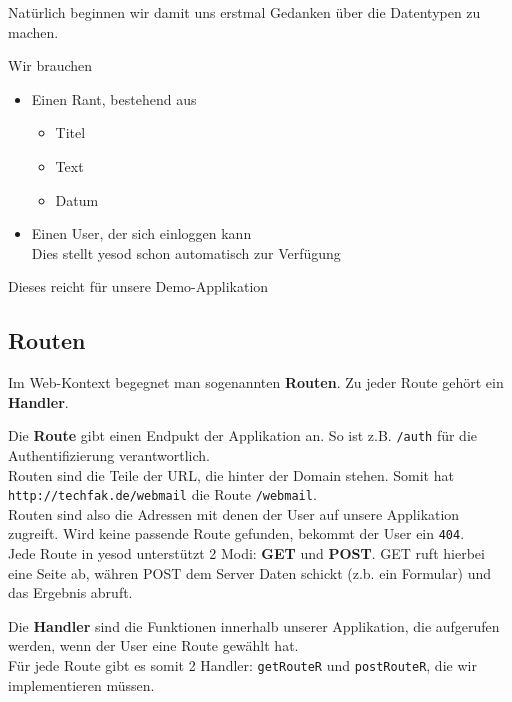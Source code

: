 \documentclass{beamer}
\begin{document}
\begin{frame}[fragile]
Natürlich beginnen wir damit uns erstmal Gedanken über die Datentypen zu machen.\\\par
\pause
Wir brauchen
\pause
\begin{itemize}
 \item Einen Rant, bestehend aus
       \begin{itemize}
        \item Titel
        \item Text
        \item Datum
       \end{itemize}
 \pause
 \item Einen User, der sich einloggen kann\\\pause
       Dies stellt yesod schon automatisch zur Verfügung
\end{itemize}
\pause
Dieses reicht für unsere Demo-Applikation
\end{frame}

\subsection{Routen}
\begin{frame}[fragile]
Im Web-Kontext begegnet man sogenannten \textbf{Routen}. Zu jeder Route gehört ein \textbf{Handler}.\\\pause \par
Die \textbf{Route} gibt einen Endpukt der Applikation an. So ist z.B. \texttt{/auth} für die Authentifizierung verantwortlich.\\\pause
Routen sind die Teile der URL, die hinter der Domain stehen. Somit hat \texttt{http://techfak.de/webmail} die Route \texttt{/webmail}.\\\pause
Routen sind also die Adressen mit denen der User auf unsere Applikation zugreift. Wird keine passende Route gefunden, bekommt der User ein \texttt{404}.\\\pause
Jede Route in yesod unterstützt 2 Modi: \textbf{GET} und \textbf{POST}. GET ruft hierbei eine Seite ab, währen POST dem Server Daten schickt (z.b. ein Formular) und das Ergebnis abruft.\\\pause\par
Die \textbf{Handler} sind die Funktionen innerhalb unserer Applikation, die aufgerufen werden, wenn der User eine Route gewählt hat.\\\pause
Für jede Route gibt es somit 2 Handler: \texttt{getRouteR} und \texttt{postRouteR}, die wir implementieren müssen.
\end{frame}
\end{document}
